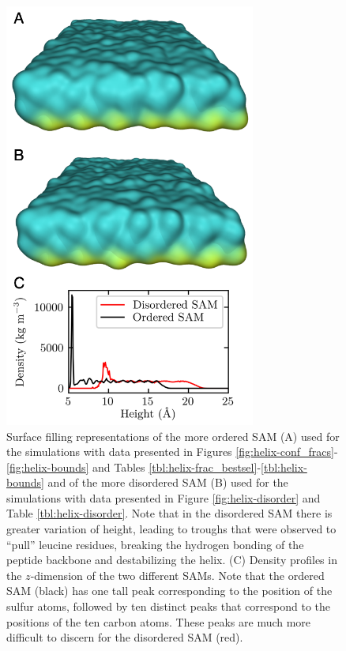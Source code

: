 \begin{figure}
    \center
    \includegraphics[width=3.25in]{figures-helix/order_figures.png}
    \caption{
        Surface filling representations of the more ordered SAM (A) used for the simulations with data presented in Figures \ref{fig:helix-conf_fracs}-\ref{fig:helix-bounds} and Tables \ref{tbl:helix-frac_bestsel}-\ref{tbl:helix-bounds} and of the more disordered SAM (B) used for the simulations with data presented in Figure \ref{fig:helix-disorder} and Table \ref{tbl:helix-disorder}. 
        Note that in the disordered SAM there is greater variation of height, leading to troughs that were observed to ``pull'' leucine residues, breaking the hydrogen bonding of the peptide backbone and destabilizing the helix. 
        (C) Density profiles in the $z$-dimension of the two different SAMs. 
        Note that the ordered SAM (black) has one tall peak corresponding to the position of the sulfur atoms, followed by ten distinct peaks that correspond to the positions of the ten carbon atoms. 
        These peaks are much more difficult to discern for the disordered SAM (red).
    }
    \label{fig:helix-disordered_sam}
\end{figure}

